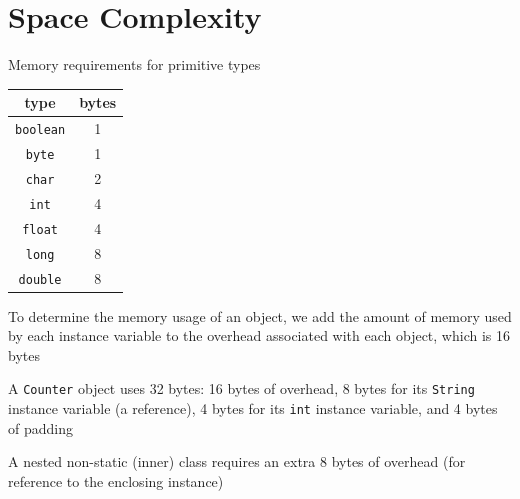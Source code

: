 \documentclass[8pt,a4paper,compress]{beamer}
\begin{document}
\section{Space Complexity}
\begin{frame}[fragile]
\pause

Memory requirements for primitive types
\begin{center}
\begin{tabular}{cc}
type & bytes \\ \hline
\lstinline$boolean$ & 1 \\
\lstinline$byte$ & 1 \\
\lstinline$char$ & 2 \\
\lstinline$int$ & 4 \\
\lstinline$float$ & 4 \\
\lstinline$long$ & 8 \\
\lstinline$double$ & 8
\end{tabular} 
\end{center}

\pause\bigskip

To determine the memory usage of an object, we add the amount of memory used by each instance variable to the overhead associated with each object, which is 16 bytes

\pause\bigskip

A \lstinline{Counter} object uses 32 bytes: 16 bytes of overhead, 8 bytes for its \lstinline{String} instance variable (a reference), 4 bytes for its \lstinline{int} instance variable, and 4 bytes of padding

\pause\bigskip

A nested non-static (inner) class requires an extra 8 bytes of overhead (for reference to the enclosing instance)
\end{frame}
\end{document}
